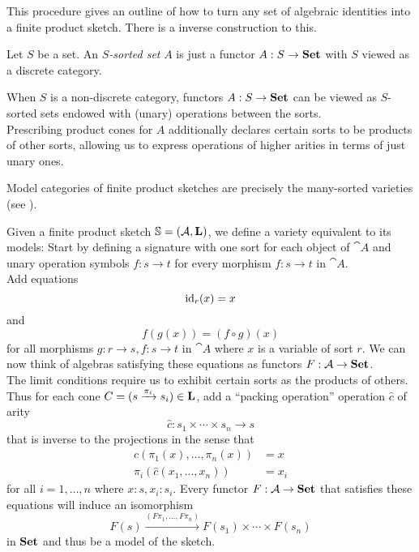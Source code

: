 This procedure gives an outline of how to turn any set of algebraic identities into a finite product sketch. There is a inverse construction to this.

\begin{Definition}
Let $S$ be a set. An \emph{$S$-sorted set} $A$ is just a functor $A : S \to \mathbf{Set}$ with $S$ viewed as a discrete category.
\end{Definition}

When $S$ is a non-discrete category, functors $A : S \to \mathbf{Set}$ can be viewed as $S$-sorted sets endowed with (unary) operations between the sorts. \\

Prescribing product cones for $A$ additionally declares certain sorts to be products of other sorts, allowing us to express operations of higher arities in terms of just unary ones.
 
\begin{Proposition}\label{prop:modelsarevarieties}
Model categories of finite product sketches are precisely the many-sorted varieties (see \cite[3.17]{AdamekRosicky}).
\end{Proposition}
\begin{Proof}
Given a finite product sketch $\mathbb S = (\mathcal{A}, \textbf{L})$, we define a variety equivalent to its models: Start by defining a signature with one sort for each object of $\cat A$ and unary operation symbols $f : s \to t$ for every morphism $f : s \to t$ in $\cat A$. \\

Add equations
\[ \textrm{id}_r(x) = x \]
and
\[ f(g(x)) = (f \circ g)(x)  \]
for all morphisms $g : r \to s, f : s \to t$ in $\cat A$ where $x$ is a variable of sort $r$. We can now think of algebras satisfying these equations as functors $F : \mathcal{A} \to \mathbf{Set}$. \\

The limit conditions require us to exhibit certain sorts as the products of others. Thus for each cone $C = (s \xrightarrow{\pi_i} s_i) \in \textbf{L}$, add a ``packing operation'' operation $\hat c$ of arity
\[ \hat c : s_1 \times \cdots \times s_n \to s \]
that is inverse to the projections in the sense that
\begin{align*}
\hat c(\pi_1(x), \ldots, \pi_n(x)) &= x \\
\pi_i(\hat c(x_1, \ldots, x_n)) &= x_i
\end{align*}
for all $i=1,\ldots,n$ where $x : s, x_i : s_i$.
Every functor $F : \mathcal{A} \to \mathbf{Set}$ that satisfies these equations will induce an isomorphism
\[ F(s) \xrightarrow{(F\pi_1,\ldots, F\pi_n)} F(s_1) \times \cdots \times F(s_n) \]
in $\mathbf{Set}$ and thus be a model of the sketch.
\end{Proof}

